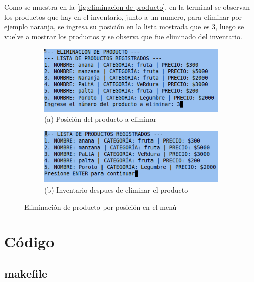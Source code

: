 \documentclass[12pt]{article}
\begin{document}
Como se muestra en la \autoref{fig:eliminacion de producto}, en la terminal se observan los productos que hay en el inventario, junto a un numero, para eliminar por ejemplo naranja, se ingresa su posición en la lista mostrada que es $3$, luego se vuelve a mostrar los productos y se observa que fue eliminado del inventario.
\begin{figure}[H]
    \centering

    \begin{subfigure}[b]{0.6\textwidth}
        \centering
        \includegraphics[width=\textwidth]{Imagenes/img12.png}
        \caption*{(a) Posición del producto a eliminar}
    \end{subfigure}
    \hfill
    \begin{subfigure}[b]{0.6\textwidth}
        \centering
        \includegraphics[width=\textwidth]{Imagenes/img13.png}
        \caption*{(b) Inventario despues de eliminar el producto}
    \end{subfigure}

    \caption{Eliminación de producto por posición en el menú}
    \label{fig:eliminacion de producto}
\end{figure}


\section{Código}

\subsection{makefile}
\inputminted[fontsize=\small]{make}{Codigo/makefile}
\end{document}
